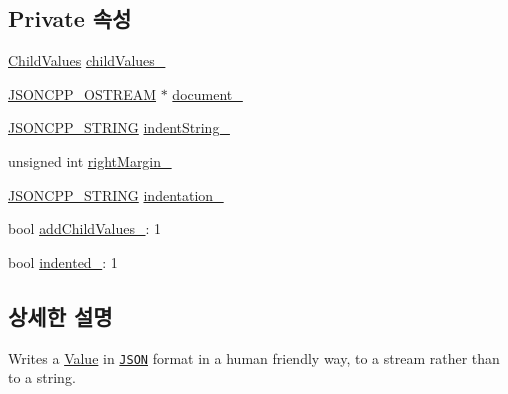 \subsection*{Private 속성}
\begin{DoxyCompactItemize}
\item 
\hyperlink{class_json_1_1_styled_stream_writer_a259bf9d99847b2ea64ec9c6dd441944e}{Child\+Values} \hyperlink{class_json_1_1_styled_stream_writer_aafd62e00a401df73fcacb2e410114b3d}{child\+Values\+\_\+}
\item 
\hyperlink{json_8h_a37a25be5fca174927780caeb280094ce}{J\+S\+O\+N\+C\+P\+P\+\_\+\+O\+S\+T\+R\+E\+AM} $\ast$ \hyperlink{class_json_1_1_styled_stream_writer_aa8c4e4576f5c3dcb10955d133a092dd6}{document\+\_\+}
\item 
\hyperlink{json_8h_a1e723f95759de062585bc4a8fd3fa4be}{J\+S\+O\+N\+C\+P\+P\+\_\+\+S\+T\+R\+I\+NG} \hyperlink{class_json_1_1_styled_stream_writer_a1481433ebe1491ea83b0beb92aed56c2}{indent\+String\+\_\+}
\item 
unsigned int \hyperlink{class_json_1_1_styled_stream_writer_a94299ec0a9bb925b2dbbab7c1f2b390a}{right\+Margin\+\_\+}
\item 
\hyperlink{json_8h_a1e723f95759de062585bc4a8fd3fa4be}{J\+S\+O\+N\+C\+P\+P\+\_\+\+S\+T\+R\+I\+NG} \hyperlink{class_json_1_1_styled_stream_writer_aa45d8fb4ca82d0550be9042012303713}{indentation\+\_\+}
\item 
bool \hyperlink{class_json_1_1_styled_stream_writer_a4e4bb7fc223b2652b72b523b1ce414fa}{add\+Child\+Values\+\_\+}\+: 1
\item 
bool \hyperlink{class_json_1_1_styled_stream_writer_aa12db1753619a9b48da41f3e45e3275d}{indented\+\_\+}\+: 1
\end{DoxyCompactItemize}


\subsection{상세한 설명}
Writes a \hyperlink{class_json_1_1_value}{Value} in \href{http://www.json.org}{\tt J\+S\+ON} format in a human friendly way, to a stream rather than to a string. 

